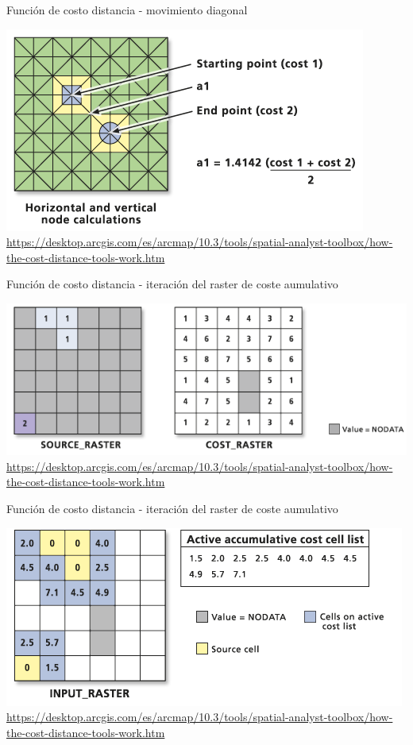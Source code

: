 \documentclass[12pt]{beamer}
\begin{document}
\begin{frame}{Función de costo distancia - movimiento diagonal}
\begin{center}
\includegraphics[scale=2]{costo3.png}
\footnotesize\url{https://desktop.arcgis.com/es/arcmap/10.3/tools/spatial-analyst-toolbox/how-the-cost-distance-tools-work.htm}
\end{center}
\end{frame}

\begin{frame}{Función de costo distancia - iteración del raster de coste aumulativo}
\begin{center}
\includegraphics[scale=2]{costo4.png}
\footnotesize\url{https://desktop.arcgis.com/es/arcmap/10.3/tools/spatial-analyst-toolbox/how-the-cost-distance-tools-work.htm}
\end{center}
\end{frame}

\begin{frame}{Función de costo distancia - iteración del raster de coste aumulativo}
\begin{center}
\includegraphics[scale=2]{costo5.png}
\footnotesize\url{https://desktop.arcgis.com/es/arcmap/10.3/tools/spatial-analyst-toolbox/how-the-cost-distance-tools-work.htm}
\end{center}
\end{frame}
\end{document}

